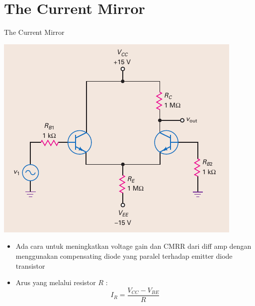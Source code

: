 \documentclass[aspectratio=169]{beamer}
\begin{document}
\section{The Current Mirror}
\begin{frame}{The Current Mirror}
	\begin{multicols}{2}
		\begin{center}
			\includegraphics[height=0.7\textheight]{gambar/01.diff-amp/01.fig22}
		\end{center}
		\columnbreak
		\begin{itemize}
			\item Ada cara untuk meningkatkan voltage gain dan CMRR dari diff amp dengan menggunakan compensating diode yang paralel terhadap emitter diode transistor
			\item Arus yang melalui resistor $ R $ :
			\begin{equation}\label{pers.23}
				I_R = \frac{V_{CC} - V_{BE}}{R}
			\end{equation}
		\end{itemize}
	\end{multicols}
\end{frame}
\end{document}
